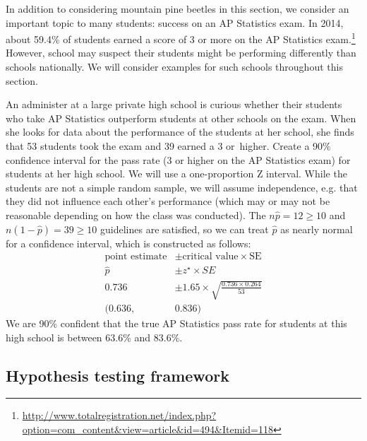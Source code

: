 In addition to considering mountain pine beetles in this section, we consider an important topic to many students: success on an AP Statistics exam. In 2014, about 59.4\% of students earned a score of 3 or more on the AP Statistics exam.\footnote{\href{http://openintro.org/redirect.php?go=apstat2014_data&referrer=aps0}{http://www.totalregistration.net/index.php?option=com\_content\&view=article\&id=494\&Itemid=118}} However, school may suspect their students might be performing differently than schools nationally. We will consider examples for such schools throughout this section. %

\begin{example}{An administer at a large private high school is curious whether their students who take AP Statistics outperform students at other schools on the exam. When she looks for data about the performance of the students at her school, she finds that 53 students took the exam and 39 earned a 3 or~higher. Create a 90\% confidence interval for the pass rate (3 or higher on the AP Statistics exam) for students at her high school.}
We will use a one-proportion Z interval. While the students are not a simple random sample, we will assume independence, e.g. that they did not influence each other's performance (which may or may not be reasonable depending on how the class was conducted). The $n\hat{p} = 12 \geq 10$ and $n(1-\hat{p}) = 39 \geq 10$ guidelines are satisfied, so we can treat $\hat{p}$ as nearly normal for a confidence interval, which is constructed as follows:
\begin{align*}
\text{point estimate} &\pm \text{critical value} \times \text{SE} \\
\hat{p} &\pm z^\star \times SE \\
0.736 &\pm 1.65 \times \sqrt{\frac{0.736 \times 0.264}{53}} \\
(0.636,& 0.836)
\end{align*}
We are 90\% confident that the true AP Statistics pass rate for students at this high school is between 63.6\% and 83.6\%.
\end{example}


\subsection{Hypothesis testing framework}

